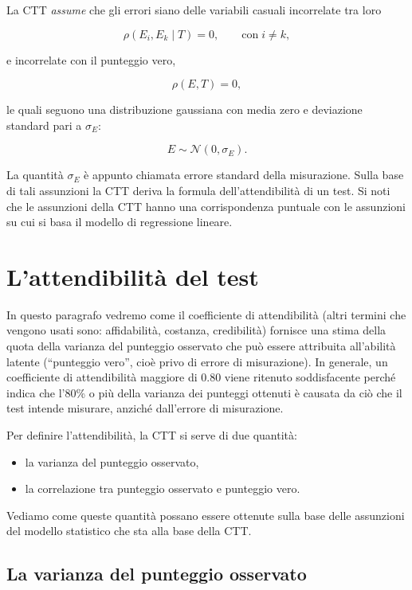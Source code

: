\documentclass[
  11pt,
]{krantz}
\providecommand{\tightlist}{%
  \setlength{\itemsep}{0pt}\setlength{\parskip}{0pt}}
\theoremstyle{definition}
\theoremstyle{definition}
\theoremstyle{definition}
\theoremstyle{definition}
\theoremstyle{remark}
\begin{document}
La CTT \emph{assume} che gli errori siano delle variabili casuali incorrelate tra loro

\[
\rho(E_i, E_k \mid T) = 0, \qquad\text{con}\; i \neq k,
\]

e incorrelate con il punteggio vero,

\[
\rho(E, T) = 0,
\]

le quali seguono una distribuzione gaussiana con media zero e deviazione standard pari a \(\sigma_E\):

\[
E \sim \mathcal{N}(0, \sigma_E).
\]

La quantità \(\sigma_E\) è appunto chiamata errore standard della misurazione. Sulla base di tali assunzioni la CTT deriva la formula dell'attendibilità di un test. Si noti che le assunzioni della CTT hanno una corrispondenza puntuale con le assunzioni su cui si basa il modello di regressione lineare.

\hypertarget{lattendibilituxe0-del-test}{%
\section{L'attendibilità del test}\label{lattendibilituxe0-del-test}}

In questo paragrafo vedremo come il coefficiente di attendibilità (altri termini che vengono usati sono: affidabilità, costanza, credibilità) fornisce una stima della quota della varianza del punteggio osservato che può essere attribuita all'abilità latente (``punteggio vero'', cioè privo di errore di misurazione). In generale, un coefficiente di attendibilità maggiore di 0.80 viene ritenuto soddisfacente perché indica che l'80\% o più della varianza dei punteggi ottenuti è causata da ciò che il test intende misurare, anziché dall'errore di misurazione.

Per definire l'attendibilità, la CTT si serve di due quantità:

\begin{itemize}
\tightlist
\item
  la varianza del punteggio osservato,
\item
  la correlazione tra punteggio osservato e punteggio vero.
\end{itemize}

Vediamo come queste quantità possano essere ottenute sulla base delle assunzioni del modello statistico che sta alla base della CTT.

\hypertarget{la-varianza-del-punteggio-osservato}{%
\subsection{La varianza del punteggio osservato}\label{la-varianza-del-punteggio-osservato}}
\end{document}

